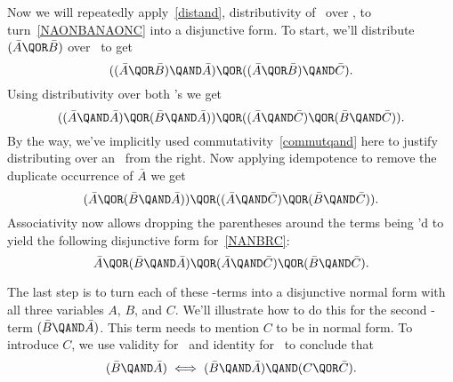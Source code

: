 Now we will repeatedly apply~\eqref{distand}, distributivity of
\QAND\ over \QOR, to turn~\eqref{NAONBANAONC} into a disjunctive form.
To start, we'll distribute $(\bar{A} \QOR \bar{B})$ over \QAND\ to get
\[
((\bar{A} \QOR \bar{B}) \QAND \bar{A}) \QOR ((\bar{A} \QOR \bar{B}) \QAND \bar{C}).
\]
Using distributivity over both \QAND's we get
\[
((\bar{A} \QAND \bar{A}) \QOR (\bar{B} \QAND \bar{A})) \QOR 
((\bar{A} \QAND \bar{C}) \QOR (\bar{B} \QAND \bar{C})).
\]
By the way, we've implicitly used commutativity~\eqref{commutqand}
here to justify distributing over an \QAND\ from the right.  Now
applying idempotence to remove the duplicate occurrence of $\bar{A}$ we
get
\[
(\bar{A} \QOR (\bar{B} \QAND \bar{A})) \QOR 
((\bar{A} \QAND \bar{C}) \QOR (\bar{B} \QAND \bar{C})).
\]
Associativity now allows dropping the parentheses around the terms
being \QOR'd to yield the following disjunctive form for~\eqref{NANBRC}:
\begin{equation}\label{DFNAONBANAONC}
\bar{A} \QOR
(\bar{B} \QAND \bar{A}) \QOR 
(\bar{A} \QAND \bar{C}) \QOR
(\bar{B} \QAND \bar{C}).
\end{equation}

The last step is to turn each of these \QAND-terms into a disjunctive
normal form with all three variables $A$, $B$, and $C$.  We'll
illustrate how to do this for the second \QAND-term
$(\bar{B} \QAND \bar{A})$.  This term needs to mention $C$ to be in
normal form.  To introduce $C$, we use validity for \QOR\ and
identity for \QAND\ to conclude that
\[
(\bar{B} \QAND \bar{A}) \iff (\bar{B} \QAND \bar{A}) \QAND (C \QOR \bar{C}).
\]

\iffalse
$\bar{B} \QAND \bar{A}$
is equivalent to
\[
(\bar{B} \QAND \bar{A}) \QAND (C \QOR \bar{C}).
\]
\fi

